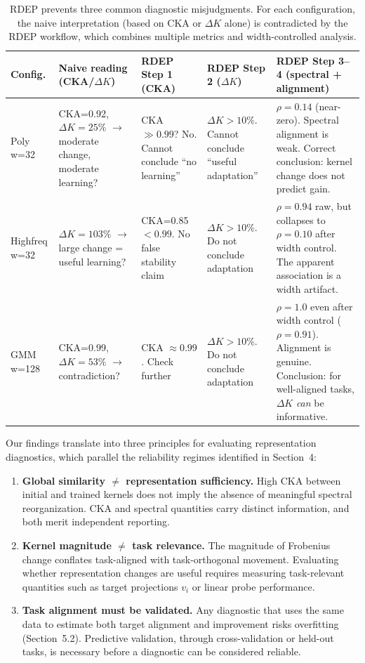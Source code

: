 \documentclass[twoside,11pt]{article}
\begin{document}
\begin{table}[t]
\centering\small
\caption{RDEP prevents three common diagnostic misjudgments.  For each configuration, the naive interpretation (based on CKA or $\Delta K$ alone) is contradicted by the RDEP workflow, which combines multiple metrics and width-controlled analysis.}
\label{tab:rdeep_cases}
\begin{tabular}{p{2cm}p{2.2cm}p{2.2cm}p{2.2cm}p{2.2cm}}
\toprule
Config. & Naive reading (CKA/$\Delta K$) & RDEP Step 1 (CKA) & RDEP Step 2 ($\Delta K$) & RDEP Step 3--4 (spectral + alignment) \\
\midrule
Poly w=32 & CKA=0.92, $\Delta K=25\%$ $\rightarrow$ moderate change, moderate learning? & CKA $\gg 0.99$? No. Cannot conclude ``no learning'' & $\Delta K >10\%$. Cannot conclude ``useful adaptation'' & $\rho=0.14$ (near-zero). Spectral alignment is weak. Correct conclusion: kernel change does not predict gain. \\
\midrule
Highfreq w=32 & $\Delta K=103\%$ $\rightarrow$ large change = useful learning? & CKA=0.85 $<0.99$. No false stability claim & $\Delta K >10\%$. Do not conclude adaptation & $\rho=0.94$ raw, but collapses to $\rho=0.10$ after width control. The apparent association is a width artifact. \\
\midrule
GMM w=128 & CKA=0.99, $\Delta K=53\%$ $\rightarrow$ contradiction? & CKA $\approx 0.99$. Check further & $\Delta K >10\%$. Do not conclude adaptation & $\rho=1.0$ even after width control ($\rho=0.91$). Alignment is genuine. Conclusion: for well-aligned tasks, $\Delta K$ \emph{can} be informative. \\
\bottomrule
\end{tabular}
\end{table}

Our findings translate into three principles for evaluating representation diagnostics, which parallel the reliability regimes identified in Section~4:

\begin{enumerate}
    \item \textbf{Global similarity $\neq$ representation sufficiency.}  High CKA between initial and trained kernels does not imply the absence of meaningful spectral reorganization.  CKA and spectral quantities carry distinct information, and both merit independent reporting.
    \item \textbf{Kernel magnitude $\neq$ task relevance.}  The magnitude of Frobenius change conflates task-aligned with task-orthogonal movement.  Evaluating whether representation changes are useful requires measuring task-relevant quantities such as target projections $v_i$ or linear probe performance.
    \item \textbf{Task alignment must be validated.}  Any diagnostic that uses the same data to estimate both target alignment and improvement risks overfitting (Section~5.2).  Predictive validation, through cross-validation or held-out tasks, is necessary before a diagnostic can be considered reliable.
\end{enumerate}
\end{document}
